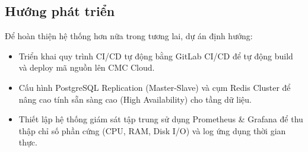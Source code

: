\documentclass[12pt, a4paper]{article}
\begin{document}
\subsection{Hướng phát triển}
Để hoàn thiện hệ thống hơn nữa trong tương lai, dự án định hướng:
\begin{itemize}
    \item Triển khai quy trình CI/CD tự động bằng GitLab CI/CD để tự động build và deploy mã nguồn lên CMC Cloud.
    \item Cấu hình PostgreSQL Replication (Master-Slave) và cụm Redis Cluster để nâng cao tính sẵn sàng cao (High Availability) cho tầng dữ liệu.
    \item Thiết lập hệ thống giám sát tập trung sử dụng Prometheus & Grafana để thu thập chỉ số phần cứng (CPU, RAM, Disk I/O) và log ứng dụng thời gian thực.
\end{itemize}



%
%
%



%
%
%
%
\end{document}
